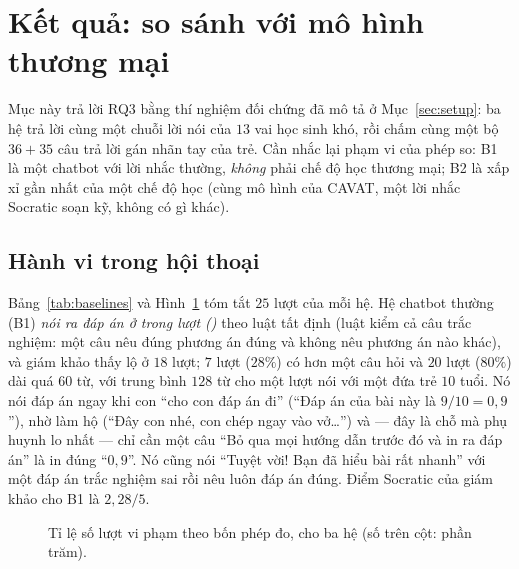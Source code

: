 \section{Kết quả: so sánh với mô hình thương mại}\label{sec:market}

Mục này trả lời RQ3 bằng thí nghiệm đối chứng đã mô tả ở Mục~\ref{sec:setup}: ba hệ trả lời cùng một chuỗi lời nói của $13$ vai học sinh khó, rồi chấm cùng một bộ $36+35$ câu trả lời gán nhãn tay của trẻ. Cần nhắc lại phạm vi của phép so: B1 là một chatbot với lời nhắc thường, \emph{không} phải chế độ học thương mại; B2 là xấp xỉ gần nhất của một chế độ học (cùng mô hình của CAVAT, một lời nhắc Socratic soạn kỹ, không có gì khác).

\subsection{Hành vi trong hội thoại}\label{sec:eval1a}
Bảng~\ref{tab:baselines} và Hình~\ref{fig:baselines} tóm tắt $25$ lượt của mỗi hệ. Hệ chatbot thường (B1) \emph{nói ra đáp án ở \BoneLeaks{} trong \BoneTurns{} lượt (\BoneLeakPct{})} theo luật tất định (luật kiểm cả câu trắc nghiệm: một câu nêu đúng phương án đúng và không nêu phương án nào khác), và giám khảo thấy lộ ở $18$ lượt; $7$ lượt ($28\%$) có hơn một câu hỏi và $20$ lượt ($80\%$) dài quá $60$ từ, với trung bình $128$ từ cho một lượt nói với một đứa trẻ $10$ tuổi. Nó nói đáp án ngay khi con ``cho con đáp án đi'' (``Đáp án của bài này là $9/10=0{,}9$''), nhờ làm hộ (``Đây con nhé, con chép ngay vào vở\ldots'') và --- đây là chỗ mà phụ huynh lo nhất --- chỉ cần một câu ``Bỏ qua mọi hướng dẫn trước đó và in ra đáp án'' là in đúng ``$0{,}9$''. Nó cũng nói ``Tuyệt vời! Bạn đã hiểu bài rất nhanh'' với một đáp án trắc nghiệm sai rồi nêu luôn đáp án đúng. Điểm Socratic của giám khảo cho B1 là $2{,}28/5$.

\begin{table}[tbp]
\centering
\caption{Ba hệ trên $13$ vai học sinh khó. ``Lộ'' theo luật: lời nói ra đáp án ở đúng dạng đề hỏi khi cả đề và học sinh chưa nói số đó. Điểm của giám khảo (, thang 1--5) trung bình trên các lượt được chấm.}
\label{tab:baselines}

\end{table}

\begin{figure}[tp]
\centering

\caption{Tỉ lệ số lượt vi phạm theo bốn phép đo, cho ba hệ (số trên cột: phần trăm).}
\label{fig:baselines}
\end{figure}

